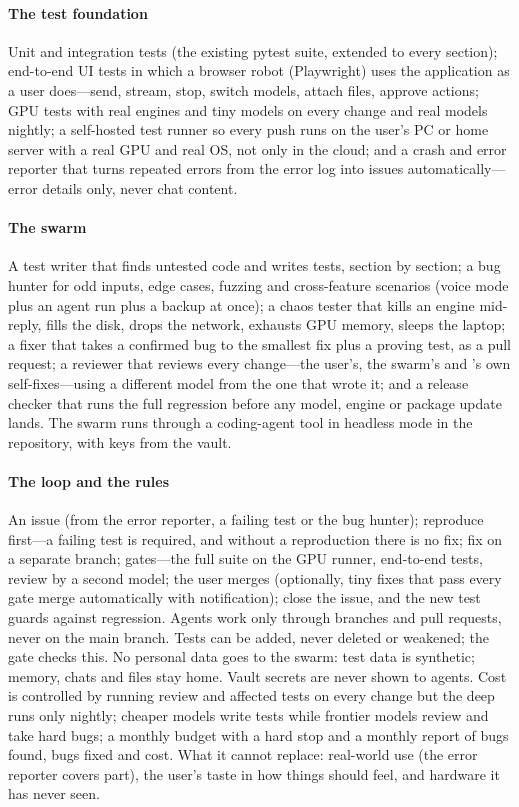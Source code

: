 \paragraph{The test foundation} Unit and integration tests (the existing pytest suite, extended to every section); end-to-end UI tests in which a browser robot (Playwright) uses the application as a user does---send, stream, stop, switch models, attach files, approve actions; GPU tests with real engines and tiny models on every change and real models nightly; a self-hosted test runner so every push runs on the user's PC or home server with a real GPU and real OS, not only in the cloud; and a crash and error reporter that turns repeated errors from the error log into issues automatically---error details only, never chat content.

\paragraph{The swarm} A test writer that finds untested code and writes tests, section by section; a bug hunter for odd inputs, edge cases, fuzzing and cross-feature scenarios (voice mode plus an agent run plus a backup at once); a chaos tester that kills an engine mid-reply, fills the disk, drops the network, exhausts GPU memory, sleeps the laptop; a fixer that takes a confirmed bug to the smallest fix plus a proving test, as a pull request; a reviewer that reviews every change---the user's, the swarm's and \hivi{}'s own self-fixes---using a different model from the one that wrote it; and a release checker that runs the full regression before any model, engine or package update lands. The swarm runs through a coding-agent tool in headless mode in the repository, with keys from the vault.

\paragraph{The loop and the rules} An issue (from the error reporter, a failing test or the bug hunter); reproduce first---a failing test is required, and without a reproduction there is no fix; fix on a separate branch; gates---the full suite on the GPU runner, end-to-end tests, review by a second model; the user merges (optionally, tiny fixes that pass every gate merge automatically with notification); close the issue, and the new test guards against regression. Agents work only through branches and pull requests, never on the main branch. Tests can be added, never deleted or weakened; the gate checks this. No personal data goes to the swarm: test data is synthetic; memory, chats and files stay home. Vault secrets are never shown to agents. Cost is controlled by running review and affected tests on every change but the deep runs only nightly; cheaper models write tests while frontier models review and take hard bugs; a monthly budget with a hard stop and a monthly report of bugs found, bugs fixed and cost. What it cannot replace: real-world use (the error reporter covers part), the user's taste in how things should feel, and hardware it has never seen.

